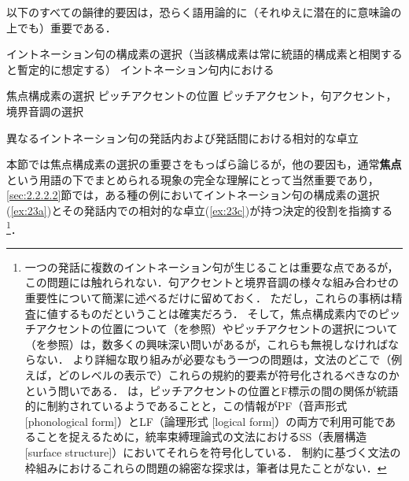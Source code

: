 \documentclass{goken}
\newcommand{\ori}[1]{\noindent\textcolor[gray]{0.7}{\fontsize{8pt}{8pt}\selectfont{\textsf{(p.~#1)}}} }
\begin{document}
以下のすべての韻律的要因は，恐らく語用論的に（それゆえに潜在的に意味論の上でも）重要である．

\begin{exe}
	 \label{ex:23}
	\begin{xlist}
		\ex イントネーション句の構成素の選択（当該構成素は常に統語的構成素と相関すると暫定的に想定する） \label{ex:23a}
    \ex イントネーション句内における
    \begin{xlist}
      \ex 焦点構成素の選択
      \ex ピッチアクセントの位置
      \ex ピッチアクセント，句アクセント，境界音調の選択
    \end{xlist}
    \ex 異なるイントネーション句の発話内および発話間における相対的な卓立 \label{ex:23c}
	\end{xlist}
\end{exe}

本節では焦点構成素の選択の重要さをもっぱら論じるが，他の要因も，通常\textbf{焦点}という用語の下でまとめられる現象の完全な理解にとって当然重要であり，\ori{30}\ref{sec:2.2.2.2}節では，ある種の例においてイントネーション句の構成素の選択(\ref{ex:23a})とその発話内での相対的な卓立(\ref{ex:23c})が持つ決定的役割を指摘する
\footnote{%
  一つの発話に複数のイントネーション句が生じることは重要な点であるが，この問題には触れられない．句アクセントと境界音調の様々な組み合わせの重要性について簡潔に述べるだけに留めておく．
  ただし，これらの事柄は精査に値するものだということは確実だろう．
  そして，焦点構成素内でのピッチアクセントの位置について（\citealt{Selkirk1984}を参照）やピッチアクセントの選択について（\citealt{PierrehumbertHirschberg1990}を参照）は，数多くの興味深い問いがあるが，これらも無視しなければならない．
  より詳細な取り組みが必要なもう一つの問題は，文法のどこで（例えば，どのレベルの表示で）これらの規約的要素が符号化されるべきなのかという問いである．
  \citeauthor{Selkirk1984}は，ピッチアクセントの位置とF標示の間の関係が統語的に制約されているようであることと，この情報がPF（音声形式 [phonological form]）とLF（論理形式 [logical form]）の両方で利用可能であることを捉えるために，統率束縛理論式の文法におけるSS（表層構造 [surface structure]）においてそれらを符号化している．
  制約に基づく文法の枠組みにおけるこれらの問題の綿密な探求は，筆者は見たことがない．
}．
\end{document}

